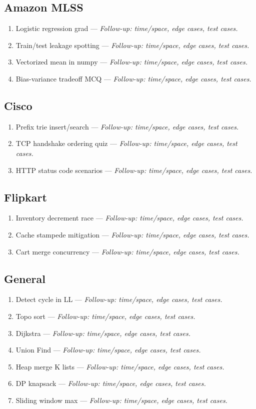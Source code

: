 \documentclass[9pt,a4paper]{article}
\begin{document}
\subsection{Amazon MLSS}
\begin{enumerate}
  \item Logistic regression grad --- \textit{Follow-up: time/space, edge cases, test cases.}
  \item Train/test leakage spotting --- \textit{Follow-up: time/space, edge cases, test cases.}
  \item Vectorized mean in numpy --- \textit{Follow-up: time/space, edge cases, test cases.}
  \item Bias-variance tradeoff MCQ --- \textit{Follow-up: time/space, edge cases, test cases.}
\end{enumerate}
\subsection{Cisco}
\begin{enumerate}
  \item Prefix trie insert/search --- \textit{Follow-up: time/space, edge cases, test cases.}
  \item TCP handshake ordering quiz --- \textit{Follow-up: time/space, edge cases, test cases.}
  \item HTTP status code scenarios --- \textit{Follow-up: time/space, edge cases, test cases.}
\end{enumerate}
\subsection{Flipkart}
\begin{enumerate}
  \item Inventory decrement race --- \textit{Follow-up: time/space, edge cases, test cases.}
  \item Cache stampede mitigation --- \textit{Follow-up: time/space, edge cases, test cases.}
  \item Cart merge concurrency --- \textit{Follow-up: time/space, edge cases, test cases.}
\end{enumerate}
\subsection{General}
\begin{enumerate}
  \item Detect cycle in LL --- \textit{Follow-up: time/space, edge cases, test cases.}
  \item Topo sort --- \textit{Follow-up: time/space, edge cases, test cases.}
  \item Dijkstra --- \textit{Follow-up: time/space, edge cases, test cases.}
  \item Union Find --- \textit{Follow-up: time/space, edge cases, test cases.}
  \item Heap merge K lists --- \textit{Follow-up: time/space, edge cases, test cases.}
  \item DP knapsack --- \textit{Follow-up: time/space, edge cases, test cases.}
  \item Sliding window max --- \textit{Follow-up: time/space, edge cases, test cases.}
\end{enumerate}
\end{document}
